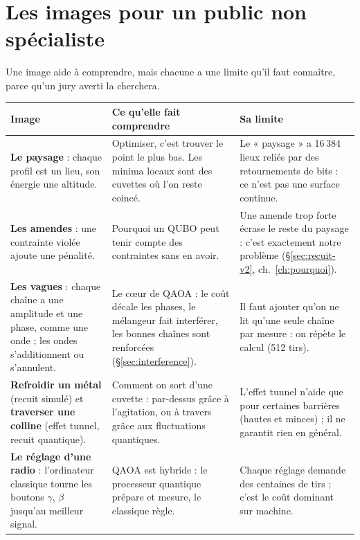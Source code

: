 \section{Les images pour un public non spécialiste}
Une image aide à comprendre, mais chacune a une limite qu'il faut connaître, parce qu'un jury averti la cherchera.
\begin{center}
\renewcommand{\arraystretch}{1.3}
\small
\begin{tabularx}{\linewidth}{>{\raggedright\arraybackslash}p{2.6cm}>{\raggedright\arraybackslash}X>{\raggedright\arraybackslash}X}
\toprule
Image & Ce qu'elle fait comprendre & Sa limite \\
\midrule
\textbf{Le paysage} : chaque profil est un lieu, son énergie une altitude. & Optimiser, c'est trouver le point le plus bas. Les minima locaux sont des cuvettes où l'on reste coincé. & Le « paysage » a 16\,384 lieux reliés par des retournements de bits : ce n'est pas une surface continue. \\
\textbf{Les amendes} : une contrainte violée ajoute une pénalité. & Pourquoi un QUBO peut tenir compte des contraintes sans en avoir. & Une amende trop forte écrase le reste du paysage : c'est exactement notre problème (§\ref{sec:recuit-v2}, ch.~\ref{ch:pourquoi}). \\
\textbf{Les vagues} : chaque chaîne a une amplitude et une phase, comme une onde ; les ondes s'additionnent ou s'annulent. & Le cœur de QAOA : le coût décale les phases, le mélangeur fait interférer, les bonnes chaînes sont renforcées (§\ref{sec:interference}). & Il faut ajouter qu'on ne lit qu'une seule chaîne par mesure : on répète le calcul (512 tirs). \\
\textbf{Refroidir un métal} (recuit simulé) et \textbf{traverser une colline} (effet tunnel, recuit quantique). & Comment on sort d'une cuvette : par-dessus grâce à l'agitation, ou à travers grâce aux fluctuations quantiques. & L'effet tunnel n'aide que pour certaines barrières (hautes et minces) ; il ne garantit rien en général. \\
\textbf{Le réglage d'une radio} : l'ordinateur classique tourne les boutons $\gamma$, $\beta$ jusqu'au meilleur signal. & QAOA est hybride : le processeur quantique prépare et mesure, le classique règle. & Chaque réglage demande des centaines de tirs ; c'est le coût dominant sur machine. \\
\bottomrule
\end{tabularx}
\end{center}

